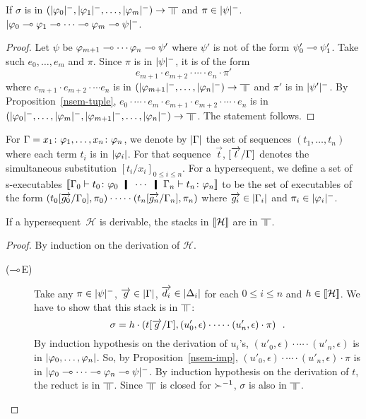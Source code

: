  \begin{proposition}
  \label{nsem-imp}
  If $\sigma$ is in
  $(\nsem{\phi_0},\nsem{\phi_1},\ldots,\nsem{\phi_m})\rightarrow\bbot$
  and $\pi\in|{\psi}|^-$.
  $|{\varphi_0\multimap\varphi_1\multimap\cdots\multimap\varphi_m\multimap\psi}|^-$.
 \end{proposition}
  \begin{proof}
   Let $\psi$ be $\varphi_{m+1}\multimap\cdots\varphi_n\multimap\psi'$ where $\psi'$
   is not of the form $\psi'_0\multimap\psi'_1$.
   Take such $e_0,\ldots,e_m$ and $\pi$.
   Since $\pi$ is in $|{\psi}|^-$,
   it is of the form
   \[
    e_{m+1}\cdot e_{m+2}\cdot \cdots \cdot e_n\cdot \pi'
   \]
   where $e_{m+1}\cdot e_{m+2}\cdot \cdots e_n$ is in
   $(\nsem{\phi_{m+1}}, \ldots, \nsem{\phi_n})\rightarrow\bbot$
   and $\pi'$ is in $|{\psi'}|^-$.
   By Proposition~\ref{nsem-tuple},
   $ e_0\cdot\cdots\cdot e_m\cdot e_{m+1}\cdot e_{m+2}\cdot \cdots \cdot e_n $ is in
   $\left(\nsem{\phi_0},\ldots,\nsem{\phi_m},\nsem{\phi_{m+1}}, \ldots,
   \nsem{\phi_n}\right)\rightarrow \bbot$.  The statement follows.
  \end{proof}

For $\Gamma = {x_1} \colon{\varphi_1},\ldots,{x_n} \colon{\varphi_n}$,
we denote by $|{\Gamma}|$ the set of sequences $(t_1,\dots,t_n)$
 where each term $t_i$ is in $|{\varphi_i}|$.
For that sequence~$\vec t$, $[\overrightarrow{t}/\Gamma]$ denotes the simultaneous substitution
$[t_i/x_i]_{0\le i \le n}$.
For a hypersequent, we
define a set of s-executables
$
\semo{\G_0\tr\tj{t_0}{\phi_0}\hmid\cdots\hmid\G_n\tr\tj{t_n}{\phi_n}}
$
to be the set of executables of the form
$
\left(t_0[\overrightarrow{g_0}/\Gamma_0],\pi_0\right)\cdot\cdots\cdot
\left(t_n[\overrightarrow{g_n}/\Gamma_n],\pi_n\right)
$
 where
$\overrightarrow{g_i} \in |{\Gamma_i}|$ and $\pi_i\in |{\varphi_i}|^-$.

 \begin{theorem}[Adequacy]
  If a hypersequent~$\mathcal H$ is derivable, the stacks in $\llbracket{\mathcal
  H}\rrbracket$ are in $\bbot$.
 \end{theorem}
  \begin{proof}
   By induction on the derivation of $\mathcal{H}$.
   \begin{description}
    \item[($\multimap$E)]
	 Take any $\pi\in|{\psi}|^-$, $\overrightarrow g\in|{\Gamma}|$,
	 $\overrightarrow{d_i}\in|{\Delta_i}|$ for each $0\le i\le n$ and
	 $h\in\llbracket{\mathcal H}\rrbracket$.
	 We have to show that this stack is in $\bbot$:
	 \[
	 \sigma = h\cdot \left(t[\overrightarrow g/\Gamma],
	 (u'_0,\epsilon)\cdot\cdots\cdot (u'_n,\epsilon)\cdot \pi\right)\enspace.
	 \]
	 By induction hypothesis on the derivation of $u_i$'s,
	 $ (u'_0,\epsilon)\cdot\cdots\cdot (u'_n,\epsilon) $ is in
	 $|{\varphi_0,\ldots,\varphi_n}|$.
	 So, by Proposition~\ref{nsem-imp},
	 $(u'_0,\epsilon)\cdot\cdots\cdot (u'_n,\epsilon)\cdot \pi$ is
	 in $|{\varphi_0\multimap\cdots\multimap\varphi_n\multimap\psi}|^-$.
	 By induction hypothesis on the derivation of $t$,
	 the reduct is in $\bbot$.
	 Since $\bbot$ is closed for ${\succ}^{-1}$, $\sigma$ is also in $\bbot$.
   \end{description}
  \end{proof}

